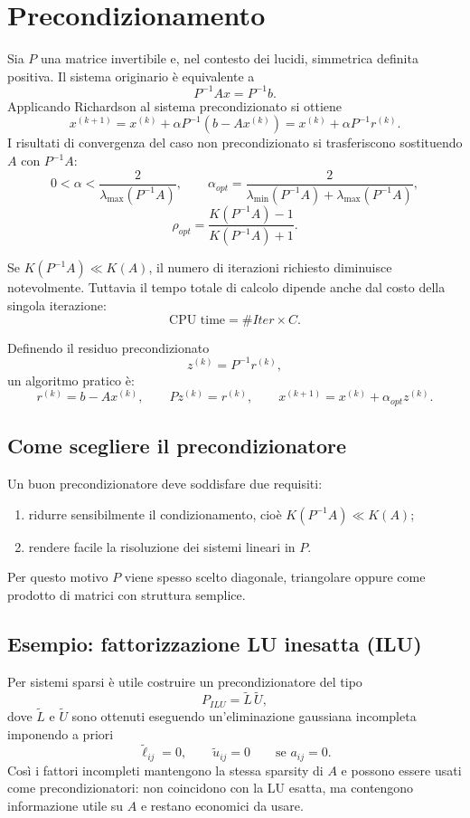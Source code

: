\documentclass[11pt,a4paper]{report}
\begin{document}
\section{Precondizionamento}
Sia $P$ una matrice invertibile e, nel contesto dei lucidi, simmetrica definita positiva. Il sistema originario \`e equivalente a
\[
P^{-1}Ax=P^{-1}b.
\]
Applicando Richardson al sistema precondizionato si ottiene
\[
 x^{(k+1)}=x^{(k)}+\alpha P^{-1}(b-Ax^{(k)})=x^{(k)}+\alpha P^{-1}r^{(k)}.
\]
I risultati di convergenza del caso non precondizionato si trasferiscono sostituendo $A$ con $P^{-1}A$:
\[
0<\alpha<\frac{2}{\lambda_{\max}(P^{-1}A)},
\qquad
\alpha_{opt}=\frac{2}{\lambda_{\min}(P^{-1}A)+\lambda_{\max}(P^{-1}A)},
\]
\[
\rho_{opt}=\frac{K(P^{-1}A)-1}{K(P^{-1}A)+1}.
\]

\begin{noteBox}
Se $K(P^{-1}A)\ll K(A)$, il numero di iterazioni richiesto diminuisce notevolmente.
Tuttavia il tempo totale di calcolo dipende anche dal costo della singola iterazione:
\[
\text{CPU time}=\#Iter\times C.
\]
\end{noteBox}

Definendo il residuo precondizionato
\[
 z^{(k)}=P^{-1}r^{(k)},
\]
un algoritmo pratico \`e:
\[
 r^{(k)}=b-Ax^{(k)},
\qquad
 Pz^{(k)}=r^{(k)},
\qquad
 x^{(k+1)}=x^{(k)}+\alpha_{opt} z^{(k)}.
\]

\subsection{Come scegliere il precondizionatore}
Un buon precondizionatore deve soddisfare due requisiti:
\begin{enumerate}[label=\arabic*)]
  \item ridurre sensibilmente il condizionamento, cio\`e $K(P^{-1}A)\ll K(A)$;
  \item rendere facile la risoluzione dei sistemi lineari in $P$.
\end{enumerate}
Per questo motivo $P$ viene spesso scelto diagonale, triangolare oppure come prodotto di matrici con struttura semplice.

\subsection{Esempio: fattorizzazione LU inesatta (ILU)}
Per sistemi sparsi \`e utile costruire un precondizionatore del tipo
\[
P_{ILU}=\widetilde L\,\widetilde U,
\]
dove $\widetilde L$ e $\widetilde U$ sono ottenuti eseguendo un'eliminazione gaussiana incompleta imponendo a priori
\[
\widetilde \ell_{ij}=0,
\qquad
\widetilde u_{ij}=0
\qquad \text{se } a_{ij}=0.
\]
Cos\`i i fattori incompleti mantengono la stessa sparsity di $A$ e possono essere usati come precondizionatori: non coincidono con la LU esatta, ma contengono informazione utile su $A$ e restano economici da usare.
\end{document}
